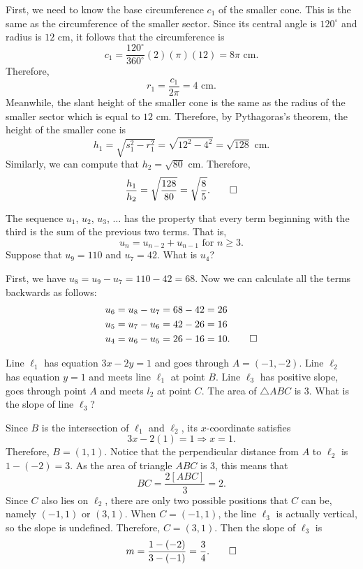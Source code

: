 \begin{solution}
\begin{center}
    \end{center}
    First, we need to know the base circumference $c_1$ of the smaller cone.
    This is the same as the circumference of the smaller sector. Since its
    central angle is $120^\circ$ and radius is $12 \text{ cm}$, it follows that
    the circumference is 
    \[ c_1 = \frac{120^\circ}{360^\circ}(2)(\pi)(12) = 8 \pi \text{ cm}. \]
    Therefore, 
    \[ r_1 = \frac{c_1}{2 \pi} = 4 \text{ cm}. \]
    Meanwhile, the slant height of the smaller cone is the same as the radius
    of the smaller sector which is equal to $12 \text{ cm}$. Therefore, by
    Pythagoras's theorem, the height of the smaller cone is 
    \[ h_1 = \sqrt{s_1^2 - r_1^2} = \sqrt{12^2 - 4^2} = \sqrt{128} \text{ cm}. \]
    Similarly, we can compute that $h_2 = \sqrt{80} \text{ cm}$. Therefore, 
    \[ \frac{h_1}{h_2} = \sqrt{\frac{128}{80}} = \sqrt{\frac{8}{5}}. \qedhere \]
\end{solution}

\begin{question}
    The sequence $u_{1}$, $u_{2}$, $u_{3}$, $\ldots$ has the property that
    every term beginning with the third is the sum of the previous two terms.
    That is,
    \[u_{n} = u_{n - 2} + u_{n - 1} \text{  for  } n \geq 3.\] 
    Suppose that $u_{9} = 110$ and $u_{7} = 42$. What is $u_{4}$?
\end{question}
\begin{solution}
    First, we have $u_8 = u_9 - u_7 = 110 - 42 = 68$. Now we can calculate all
    the terms backwards as follows:
    \begin{align*}
        u_6 &= u_8 - u_7 = 68 - 42 = 26\\
        u_5 &= u_7 - u_6 = 42 - 26 = 16\\
        u_4 &= u_6 - u_5 = 26 - 16 = 10. \qedhere
    \end{align*}
\end{solution}

\begin{question}
    Line $\ell_{1}$ has equation $3x - 2y = 1$ and goes through $A = (-1, -2)$.
    Line $\ell_{2}$ has equation $y = 1$ and meets line $\ell_{1}$ at point
    $B$. Line $\ell_{3}$ has positive slope, goes through point $A$ and meets
    $l_{2}$ at point $C$. The area of $\triangle ABC$ is 3. What is the slope
    of line $\ell_{3}$?
\end{question}
\begin{solution}
    Since $B$ is the intersection of $\ell_1$ and $\ell_2$, its $x$-coordinate
    satisfies
    \[ 3x - 2(1) = 1 \Longrightarrow x = 1. \]
    Therefore, $B = (1, 1)$. Notice that the perpendicular distance from $A$ to
    $\ell_2$ is $1 - (-2) = 3$. As the area of triangle $ABC$ is 3, this means
    that 
    \[ BC = \frac{2[ABC]}{3} = 2. \]
    Since $C$ also lies on $\ell_2$, there are only two possible positions that
    $C$ can be, namely $(-1, 1)$ or $(3, 1)$. When $C = (-1, 1)$, the line
    $\ell_3$ is actually vertical, so the slope is undefined. Therefore, $C =
    (3, 1)$. Then the slope of $\ell_3$ is 
    \[ m = \frac{1 - (-2)}{3 - (-1)} = \frac{3}{4}.\qedhere \]
\end{solution}

